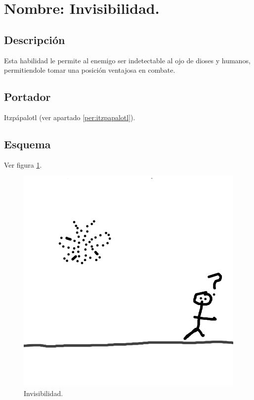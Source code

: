 \section{Nombre: Invisibilidad.} \label{hab.Invis}
\subsection{Descripción}
Esta habilidad le permite al enemigo ser indetectable al ojo de dioses y humanos, permitiendole tomar una posición ventajosa en combate.
\subsection{Portador}
Itzpápalotl (ver apartado \ref{per:itzpapalotl}).
\subsection{Esquema}
			Ver figura \ref{fig:invisibilidad}.
			\begin{figure}
				\centering
				\includegraphics[height=0.2 \textheight]{Imagenes/invisibilidad}
				\caption{Invisibilidad.}
				\label{fig:invisibilidad}
			\end{figure}